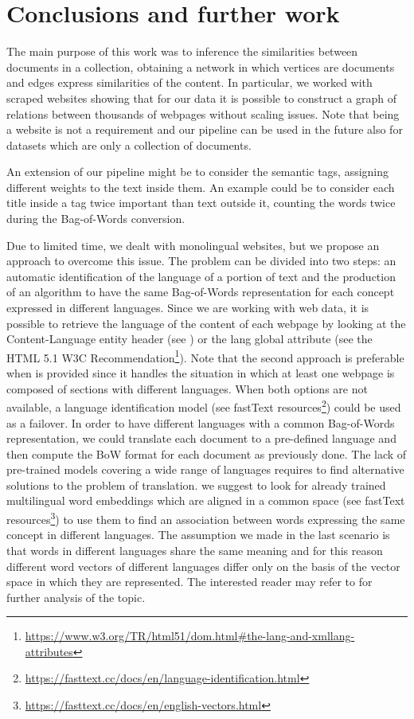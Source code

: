 \chapter{Conclusions and further work}
The main purpose of this work was to inference
the similarities between documents in a collection,
obtaining a network in which vertices are documents and
edges express similarities of the content.
In particular, we worked with scraped websites
showing that for our data it is possible to construct
a graph of relations between thousands of webpages
without scaling issues. 
Note that being a website is not a requirement and 
our pipeline can be used in the future also for 
datasets which are only a collection of documents.

An extension of our pipeline might be to consider the semantic tags, 
assigning different weights to the text inside them. 
An example could be to consider each title inside a  
tag twice important than text outside it, 
counting the words twice during the Bag-of-Words conversion.

Due to limited time, we dealt with monolingual
websites, but we propose an approach to overcome this issue.
The problem can be divided into two steps:
an automatic identification of the language of a portion of text and
the production of an algorithm to have the same Bag-of-Words
representation for each concept expressed in different languages.
Since we are working with web data, it is possible to retrieve the language
of the content of each webpage by looking at the Content-Language entity header
(see \cite{rfc7231}) or the lang global attribute
(see the HTML 5.1 W3C Recommendation\footnote{\url{https://www.w3.org/TR/html51/dom.html\#the-lang-and-xmllang-attributes}}).
Note that the second approach is preferable when  is provided
since it handles the situation in which at least
one webpage is composed of sections with different languages.
When both options are not available,
a language identification model
(see fastText resources\footnote{\url{https://fasttext.cc/docs/en/language-identification.html}})
could be used as a failover.
In order to have different languages with a common Bag-of-Words
representation, we could translate each document to a pre-defined language
and then compute the BoW format for each document as previously done.
The lack of pre-trained models covering a wide range
of languages requires to find alternative solutions to the problem of translation.
we suggest to look for already trained multilingual word embeddings
which are aligned in a common space (see fastText resources\footnote{\url{https://fasttext.cc/docs/en/english-vectors.html}})
to use them to find an association between words expressing the same concept in different languages.
The assumption we made in the last scenario is that words in different languages share
the same meaning and for this reason different word vectors of different languages differ only on the basis
of the vector space in which they are represented.
The interested reader may refer to \cite{DBLP:journals/corr/abs-1804-07745} for further analysis of the topic.

